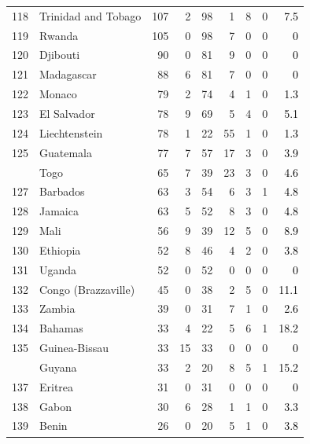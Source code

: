 \documentclass[12pt, a4paper,oneside]{book}
\theoremstyle{definition}
\begin{document}
\begin{longtable}{llrrrrrrr}
	118 & Trinidad and Tobago & 107 & 2 & 98 & 1 & 8 & 0 & \textcolor{black}{7.5}\\
	\rowcolor{gray!6}  119 & Rwanda & 105 & 0 & 98 & 7 & 0 & 0 & \textcolor{black}{0}\\
	120 & Djibouti & 90 & 0 & 81 & 9 & 0 & 0 & \textcolor{black}{0}\\
	\addlinespace
	\rowcolor{gray!6}  121 & Madagascar & 88 & 6 & 81 & 7 & 0 & 0 & \textcolor{black}{0}\\
	122 & Monaco & 79 & 2 & 74 & 4 & 1 & 0 & \textcolor{black}{1.3}\\
	\rowcolor{gray!6}  123 & El Salvador & 78 & 9 & 69 & 5 & 4 & 0 & \textcolor{black}{5.1}\\
	124 & Liechtenstein & 78 & 1 & 22 & 55 & 1 & 0 & \textcolor{black}{1.3}\\
	\rowcolor{gray!6}  125 & Guatemala & 77 & 7 & 57 & 17 & 3 & 0 & \textcolor{black}{3.9}\\
	\addlinespace
	126 & Togo & 65 & 7 & 39 & 23 & 3 & 0 & \textcolor{black}{4.6}\\
	\rowcolor{gray!6}  127 & Barbados & 63 & 3 & 54 & 6 & 3 & 1 & \textcolor{black}{4.8}\\
	128 & Jamaica & 63 & 5 & 52 & 8 & 3 & 0 & \textcolor{black}{4.8}\\
	\rowcolor{gray!6}  129 & Mali & 56 & 9 & 39 & 12 & 5 & 0 & \textcolor{black}{8.9}\\
	130 & Ethiopia & 52 & 8 & 46 & 4 & 2 & 0 & \textcolor{black}{3.8}\\
	\addlinespace
	\rowcolor{gray!6}  131 & Uganda & 52 & 0 & 52 & 0 & 0 & 0 & \textcolor{black}{0}\\
	132 & Congo (Brazzaville) & 45 & 0 & 38 & 2 & 5 & 0 & \textcolor{black}{11.1}\\
	\rowcolor{gray!6}  133 & Zambia & 39 & 0 & 31 & 7 & 1 & 0 & \textcolor{black}{2.6}\\
	134 & Bahamas & 33 & 4 & 22 & 5 & 6 & 1 & \textcolor{black}{18.2}\\
	\rowcolor{gray!6}  135 & Guinea-Bissau & 33 & 15 & 33 & 0 & 0 & 0 & \textcolor{black}{0}\\
	\addlinespace
	136 & Guyana & 33 & 2 & 20 & 8 & 5 & 1 & \textcolor{black}{15.2}\\
	\rowcolor{gray!6}  137 & Eritrea & 31 & 0 & 31 & 0 & 0 & 0 & \textcolor{black}{0}\\
	138 & Gabon & 30 & 6 & 28 & 1 & 1 & 0 & \textcolor{black}{3.3}\\
	\rowcolor{gray!6}  139 & Benin & 26 & 0 & 20 & 5 & 1 & 0 & \textcolor{black}{3.8}\\

\end{longtable}
\end{document}
